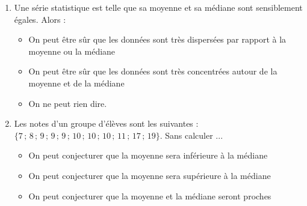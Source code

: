 \begin{exo}[8 points]
\begin{enumerate}
\begin{enumerate}
\begin{multicols}{3}
\begin{itemize}
			\item 16,2 \sautcol
			\item 17 \sautcol
			\item 40
		\end{itemize}\end{multicols}
  \item Le prix de vente m\'edian (en \euro{}) est de :
    \renewcommand{\labelitemi}{$\square$}
	\vspace{-1em}\begin{multicols}{3}
		\begin{itemize}
			\item 16 \sautcol
			\item 17 \sautcol
			\item 30
		\end{itemize}\end{multicols}
 \end{enumerate}
 \item Une s\'erie statistique est telle que sa moyenne et sa m\'ediane sont sensiblement \'egales. Alors :
    \renewcommand{\labelitemi}{$\square$}
		\begin{itemize}
			\item On peut \^etre s\^ur que les donn\'ees sont tr\`es dispers\'ees par rapport \`a la moyenne ou la m\'ediane %
			\item On peut \^etre s\^ur que les donn\'ees sont tr\`es concentr\'ees autour de la moyenne et de la m\'ediane %
			\item On ne peut rien dire.
		\end{itemize}%
 \item Les notes d'un groupe d'\'el\`eves sont les suivantes : $\{7\,;\, 8\,;\, 9\,;\, 9\,;\, 9\,;\, 10\,;\, 10\,;\,10\,;\, 11\,;\, 17\,;\, 19\}$. Sans calculer ...
    \renewcommand{\labelitemi}{$\square$}
		\begin{itemize}
			\item On peut conjecturer que la moyenne sera inf\'erieure \`a la m\'ediane %
			\item On peut conjecturer que la moyenne sera sup\'erieure \`a la m\'ediane %
			\item On peut conjecturer que la moyenne et la m\'ediane seront proches

\end{itemize}
\end{enumerate}
\end{exo}
